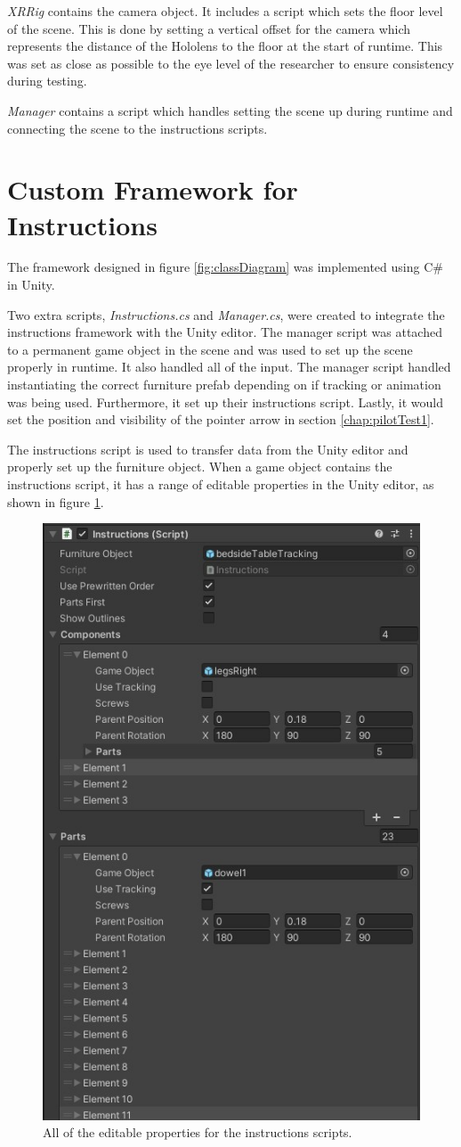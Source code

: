 \documentclass{l4proj}
\begin{document}
\textit{XRRig} contains the camera object. It includes a script which sets the floor level of the scene. This is done by setting a vertical offset for the camera which represents the distance of the Hololens to the floor at the start of runtime. This was set as close as possible to the eye level of the researcher to ensure consistency during testing.

\textit{Manager} contains a script which handles setting the scene up during runtime and connecting the scene to the instructions scripts.

\section{Custom Framework for Instructions}

The framework designed in figure \ref{fig:classDiagram} was implemented using C\# in Unity. 

Two extra scripts, \textit{Instructions.cs} and \textit{Manager.cs}, were created to integrate the instructions framework with the Unity editor. The manager script was attached to a permanent game object in the scene and was used to set up the scene properly in runtime. It also handled all of the input. The manager script handled instantiating the correct furniture prefab depending on if tracking or animation was being used. Furthermore, it set up their instructions script. Lastly, it would set the position and visibility of the pointer arrow in section \ref{chap:pilotTest1}.

The instructions script is used to transfer data from the Unity editor and properly set up the furniture object. When a game object contains the instructions script, it has a range of editable properties in the Unity editor, as shown in figure \ref{fig:properties}.

\begin{figure}[hbt!]
    \centering
    \includegraphics[width=0.4\linewidth]{dissertation//images/instructionsProperties.jpg}
    \caption{All of the editable properties for the instructions scripts.}
    \label{fig:properties}
\end{figure}
\end{document}
